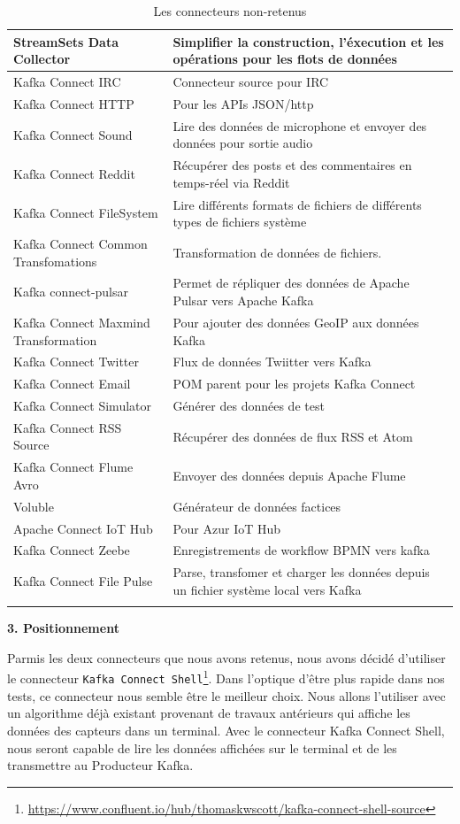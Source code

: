 \documentclass{article}
\begin{document}
\begin{longtable}{|p{7.5cm}|p{7.5cm}|}
				StreamSets Data Collector & Simplifier la construction, l’éxecution et les opérations pour les flots de données\\\hline
				Kafka Connect IRC & Connecteur source pour IRC\\\hline
				Kafka Connect HTTP & Pour les APIs JSON/http\\\hline
				Kafka Connect Sound & Lire des données de microphone et envoyer des données pour sortie audio\\\hline
				Kafka Connect Reddit & Récupérer des posts et des commentaires en temps-réel via Reddit\\\hline
				Kafka Connect FileSystem & Lire différents formats de fichiers de différents types de fichiers système\\\hline
				Kafka Connect Common Transfomations & Transformation de données de fichiers.\\\hline
				Kafka connect-pulsar & Permet de répliquer des données de Apache Pulsar vers Apache Kafka\\\hline
				Kafka Connect Maxmind Transformation & Pour ajouter des données GeoIP aux données Kafka\\\hline
				Kafka Connect Twitter & Flux de données Twiitter vers Kafka\\\hline
				Kafka Connect Email & POM parent pour les projets Kafka Connect\\\hline
				Kafka Connect Simulator & Générer des données de test\\\hline
				Kafka Connect RSS Source & Récupérer des données de flux RSS et Atom\\\hline
				Kafka Connect Flume Avro & Envoyer des données depuis Apache Flume\\\hline
				Voluble & Générateur de données factices\\\hline
				Apache Connect IoT Hub & Pour Azur IoT Hub\\\hline
				Kafka Connect Zeebe	& Enregistrements de workflow BPMN vers kafka\\\hline
				Kafka Connect File Pulse & Parse, transfomer et charger les données  depuis un fichier système local vers Kafka\\\hline
				\caption{Les connecteurs non-retenus}
				\label{tab:connecteursnon}
			\end{longtable}\par
			\textbf{3. Positionnement}\par
			Parmis les deux connecteurs que nous avons retenus, nous avons décidé d'utiliser le connecteur \texttt{Kafka Connect Shell}\footnote{\href{https://www.confluent.io/hub/thomaskwscott/kafka-connect-shell-source}{https://www.confluent.io/hub/thomaskwscott/kafka-connect-shell-source}}.
			Dans l'optique d'être plus rapide dans nos tests, ce connecteur nous semble être le meilleur choix.
			Nous allons l'utiliser avec un algorithme déjà existant provenant de travaux antérieurs qui affiche les données des capteurs dans un terminal.
			Avec le connecteur Kafka Connect Shell, nous seront capable de lire les données affichées sur le terminal et de les transmettre au Producteur Kafka.
\end{document}
